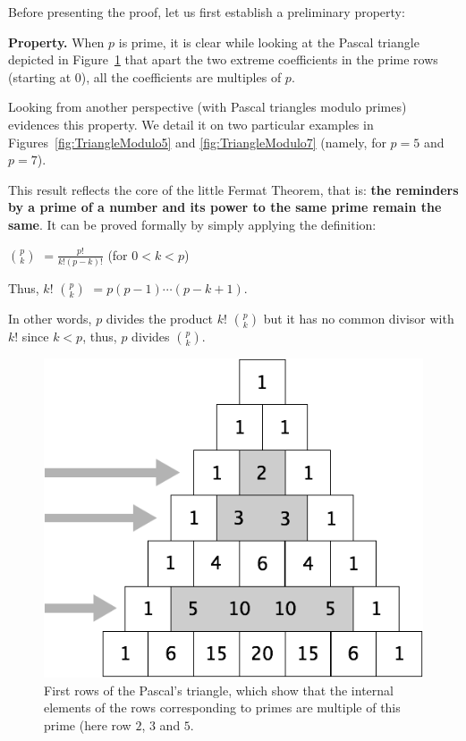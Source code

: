 Before presenting the proof, let us first establish a preliminary property:
\medskip

\noindent \textbf{Property.} 
\label{prop:preliminaryFermat}
When $p$ is prime, it is clear while looking at the Pascal triangle depicted
in Figure~\ref{fig:TrianglePrime} that apart the two extreme coefficients in the prime rows (starting at 0), all the coefficients are multiples of $p$.

Looking from another perspective (with Pascal triangles modulo primes) evidences this property. 
We detail it on two particular examples in Figures~\ref{fig:TriangleModulo5} and \ref{fig:TriangleModulo7} (namely, for $p=5$ and $p=7$). 

%
%
%
%
%
%

This result reflects the core of the little Fermat Theorem, that is: \textbf{the reminders by a prime of a number and its power to the same prime remain the same}.
It can be proved formally by simply applying the definition: 

${p}\choose{k}$ $= \frac{p!}{k!(p-k)!}$ (for $0 < k < p$)

Thus,  $k!$ ${p}\choose{k}$ $= p(p-1)\cdots(p-k+1)$.

In other words, $p$ divides the product $k!$ ${p}\choose{k} $ but it has no common divisor with $k!$ since $k < p$, thus, $p$ divides ${p}\choose{k}$.
\medskip

\begin{figure}[h]
\begin{center}
        \includegraphics[scale=0.4]{FiguresArithmetic/TrianglePascalPrimes.png}
        \caption{First rows of the Pascal's triangle, which show that the internal elements of the rows corresponding to primes are multiple of this prime
        (here row $2$, $3$ and $5$.}
        \label{fig:TrianglePrime}
\end{center}
\end{figure}

